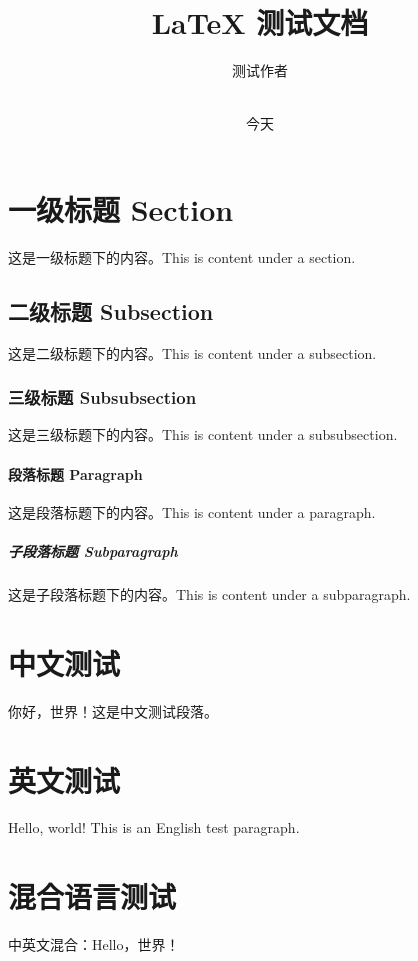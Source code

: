 \documentclass{article}
\title{LaTeX 测试文档}
\author{测试作者}
\date{\\今天}
\begin{document}
\maketitle

\section{一级标题 Section}
这是一级标题下的内容。This is content under a section.

\subsection{二级标题 Subsection}
这是二级标题下的内容。This is content under a subsection.

\subsubsection{三级标题 Subsubsection}
这是三级标题下的内容。This is content under a subsubsection.

\paragraph{段落标题 Paragraph}
这是段落标题下的内容。This is content under a paragraph.

\subparagraph{子段落标题 Subparagraph}
这是子段落标题下的内容。This is content under a subparagraph.

\section{中文测试}
你好，世界！这是中文测试段落。

\section{英文测试}
Hello, world! This is an English test paragraph.

\section{混合语言测试}
中英文混合：Hello，世界！
\end{document}
